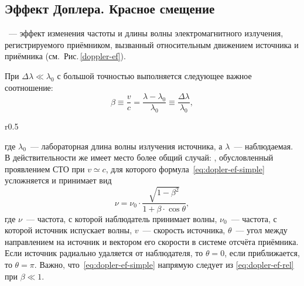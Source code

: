 \subsection{Эффект Доплера. Красное смещение}
~--- эффект изменения частоты и длины волны электромагнитного излучения, регистрируемого приёмником, вызванный относительным движением источника и приёмника (см.~Рис.\,\ref{doppler-ef}).

При $\Delta \lambda \ll \lambda_0$ с большой точностью выполняется следующее важное соотношение:\begin{equation}
\beta \equiv \dfrac{v}{c} = \dfrac{\lambda - \lambda_0}{\lambda_0} \equiv \dfrac{\Delta \lambda}{\lambda_0},
\label{eq:dopler-ef-simple}
\end{equation}
\begin{wrapfigure}[6]{r}{0.5\tw}
\centering
\vspace{-.5pc}

\caption{Эффект Доплера}
\label{doppler-ef}
\end{wrapfigure}
где $\lambda_0$~--- лабораторная длина волны излучения источника, а $\lambda$~--- наблюдаемая. В действительности же имеет место более общий случай: , обусловленный проявлением СТО при $v \simeq c$, для которого формула~\eqref{eq:dopler-ef-simple} усложняется и принимает вид
\begin{equation}
\nu = \nu_0 \cdot \dfrac{\sqrt{1 - \beta^2}}{1 + \beta \cdot \cos\theta},
\label{eq:dopler-ef-rel}
\end{equation}
где $\nu$~--- частота, с которой наблюдатель принимает волны, $\nu_0$~--- частота, с которой источник испускает волны, $v$~--- скорость источника, $\theta$~--- угол между направлением на источник и вектором его скорости в системе отсчёта приёмника. Если источник радиально удаляется от наблюдателя, то $\theta = 0$, если приближается, то $\theta =\pi$. Важно, что~\eqref{eq:dopler-ef-simple} напрямую следует из \eqref{eq:dopler-ef-rel} при $\beta  \ll 1$.

